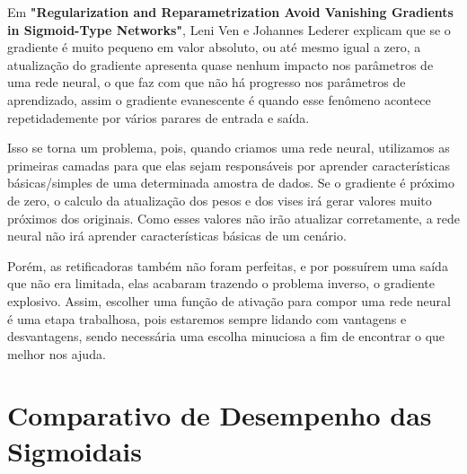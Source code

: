 Em \textbf{"Regularization and Reparametrization Avoid Vanishing Gradients in Sigmoid-Type Networks"}, Leni Ven e Johannes Lederer explicam que se o gradiente é muito pequeno em valor absoluto, ou até mesmo igual a zero, a atualização do gradiente apresenta quase nenhum impacto nos parâmetros de uma rede neural, o que faz com que não há progresso nos parâmetros de aprendizado, assim o gradiente evanescente é quando esse fenômeno acontece repetidademente por vários parares de entrada e saída.

Isso se torna um problema, pois, quando criamos uma rede neural, utilizamos as primeiras camadas para que elas sejam responsáveis por aprender características básicas/simples de uma determinada amostra de dados. Se o gradiente é próximo de zero, o calculo da atualização dos pesos e dos vises irá gerar valores muito próximos dos originais. Como esses valores não irão atualizar corretamente, a rede neural não irá aprender características básicas de um cenário.

Porém, as retificadoras também não foram perfeitas, e por possuírem uma saída que não era limitada, elas acabaram trazendo o problema inverso, o gradiente explosivo. Assim, escolher uma função de ativação para compor uma rede neural é uma etapa trabalhosa, pois estaremos sempre lidando com vantagens e desvantagens, sendo necessária uma escolha minuciosa a fim de encontrar o que melhor nos ajuda.

\section{Comparativo de Desempenho das Sigmoidais}